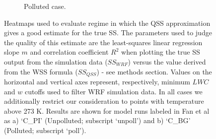 \documentclass{article}
\begin{document}
\begin{figure}[ht]
\begin{subfigure}{0.7\textwidth}
		\caption{Polluted case.}
		\label{filtcritheatmapseppoll}
	\end{subfigure}
	\caption{Heatmaps used to evaluate regime in which the QSS approximation gives a good estimate for the true SS. The parameters used to judge the quality of this estimate are the least-squares linear regression slope $m$ and correlation coefficient $R^2$ when plotting the true SS output from the simulation data ($SS_{WRF}$) versus the value derived from the WSS formula ($SS_{QSS}$) - see methods section. Values on the horizontal and vertical axes represent, respectively, minimum $LWC$ and $w$ cutoffs used to filter WRF simulation data. In all cases we additionally restrict our consideration to points with temperature above 273 K. Results are shown for model runs labeled in Fan et al as a) `C\_PI' (Unpolluted; subscript `unpoll') and b) `C\_BG' (Polluted; subscript `poll').}
	\label{filtcritheatmapsep}
\end{figure}
\end{document}
